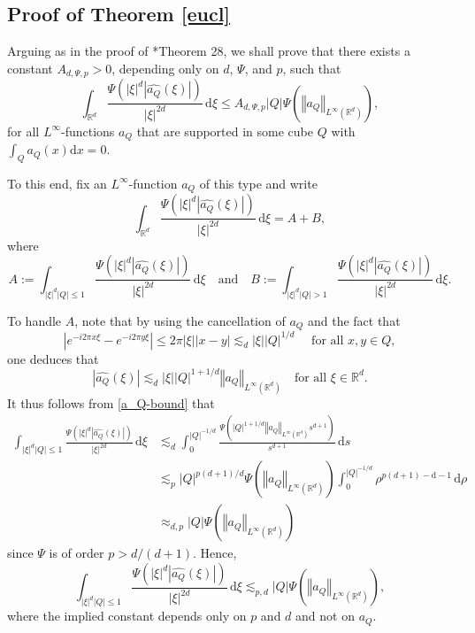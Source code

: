 \documentclass[a4paper, leqno, 10pt]{amsart}
\numberwithin{equation}{section}
\newcommand{\dd}{\mathrm{d}}
\newcommand{\R}{\mathbb{R}}
\newcommand{\norm}[1]{\left\Vert#1\right\Vert}
\newcommand{\brkt}[1]{\left(#1\right)}
\newcommand{\abs}[1]{\left|#1\right|}
\begin{document}
\subsection{Proof of Theorem \ref{eucl}}\label{eucl_det}
Arguing as in the proof of \cite{BPRS}*{Theorem 28}, we shall prove that there exists a constant $A_{d, \Psi,p} > 0$, depending only on $d$, $\Psi$, and $p$, such that
\begin{equation}\label{atom_bound}
\int_{\R^d} \frac{ \Psi \brkt{\abs{\xi}^d\abs{\widehat{a_Q}(\xi)}}}{\abs{\xi}^{2d}} \, \dd \xi \leq A_{d, \Psi, p} \abs{Q} \Psi \brkt{ \norm{a_Q}_{L^{\infty} (\R^d)}},
\end{equation}
for all $L^{\infty}$-functions $a_Q$  that are supported in some cube $Q$ with $\int_Q a_Q (x) \dd x = 0$.

To this end, fix an $L^{\infty}$-function $a_Q$ of this type and write
\begin{equation}\label{A-B}
\int_{\R^d} \frac{ \Psi \brkt{\abs{\xi}^d\abs{\widehat{a_Q}(\xi)}}}{\abs{\xi}^{2d}} \, \dd \xi = A + B,
\end{equation}
where
\[ A:= \int_{\abs{\xi}^{d}\abs{Q}\leq 1} \frac{\Psi \brkt{\abs{\xi}^d\abs{\widehat{a_Q}(\xi)}}}{\abs{\xi}^{2d}} \, \dd \xi  \quad \text{and} \quad B:= \int_{\abs{\xi}^{d}\abs{Q} > 1} \frac{\Psi \brkt{\abs{\xi}^d\abs{\widehat{a_Q}(\xi)}}}{\abs{\xi}^{2d}} \, \dd \xi . 
 \]

To handle $A$, note that by using the cancellation of $a_Q$ and the fact that 
\[ 
\abs{ e^{-i2\pi x \xi} - e^{-i2\pi y \xi} } \leq 2 \pi  \abs{ \xi } \abs{ x-y } \lesssim_d \abs{\xi} \abs{Q}^{1/d} \quad \text{ for all } x,y \in Q, 
\]
one deduces that
\begin{equation}\label{a_Q-bound}
\abs{\widehat{a_Q}(\xi)} \lesssim_d \abs{\xi} \abs{Q}^{1+1/d}\norm{a_Q}_{L^{\infty} (\R^d)} \quad \text{for all } \xi \in \R^d. 
\end{equation}
It thus follows from \eqref{a_Q-bound} that
\begin{align*}
\int_{\abs{\xi}^{d}\abs{Q}\leq 1} \frac{\Psi \brkt{\abs{\xi}^d\abs{\widehat{a_Q}(\xi)}}}{\abs{\xi}^{2d}} \, \dd \xi &\lesssim_d  \int_0^{\abs{Q}^{-1/d}} \frac{\Psi \brkt{ \abs{ Q}^{1+1/d}\norm{a_Q}_{L^{\infty} (\R^d)} s^{d+1} } }{s^{d+1}} \, \dd s \\
&\lesssim_p {\abs{Q}^{p(d+1)/d}}  \Psi \brkt{ \norm{a_Q}_{L^{\infty} (\R^d)}} \int_0^{\abs{Q}^{-1/d}}  \rho^{p (d+1) -\dd- 1} \, \dd \rho \\
& \approx_{d,p} {\abs{Q}} \Psi \brkt{ \norm{a_Q}_{L^{\infty} (\R^d)}}
\end{align*}
since $\Psi$ is of order $p>d/(d+1)$. Hence,
\begin{equation}\label{A}
\int_{\abs{\xi}^{d}\abs{Q}\leq 1} \frac{\Psi \brkt{\abs{\xi}^d\abs{\widehat{a_Q}(\xi)}}}{\abs{\xi}^{2d}} \, \dd \xi \lesssim_{p,d} {\abs{Q}} \Psi \brkt{ \norm{a_Q}_{L^{\infty} (\R^d)}},
\end{equation}
where the implied constant depends only on $p$ and $d$ and not on $a_Q$. 
\end{document}
